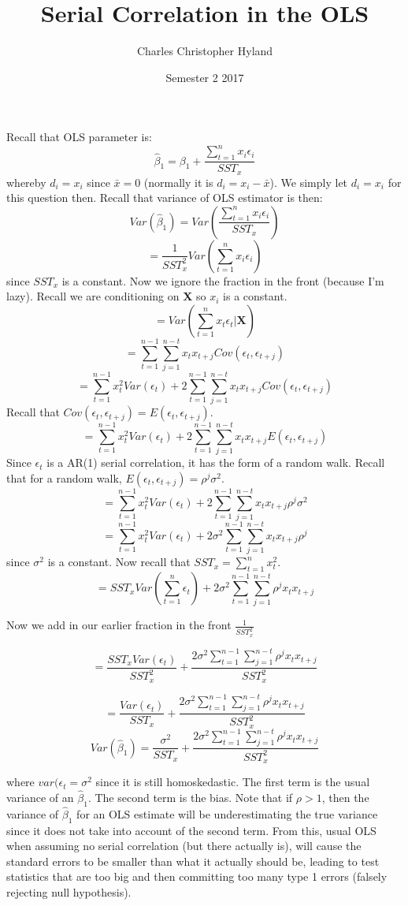 \documentclass[11pt, oneside]{article}
\title{Serial Correlation in the OLS}
\author{Charles Christopher Hyland}
\date{Semester 2 2017}
\theoremstyle{definition}
\begin{document}
\maketitle
{}

Recall that OLS parameter is:
$$
\hat{\beta}_1 = \beta_1 + \frac{\sum\limits_{t=1}^nx_i\epsilon_i}{SST_x}
$$
whereby $d_i = x_i$ since $\bar{x} = 0$ (normally it is $d_i = x_i - \bar{x}$). We simply let $d_i = x_i$ for this question then. Recall that variance of OLS estimator is then:
$$
Var(\hat{\beta}_1) = Var(\frac{\sum\limits_{t=1}^nx_i\epsilon_i}{SST_x})
$$
$$
= \frac{1}{SST_x^2}Var(\sum\limits_{t=1}^nx_i\epsilon_i)
$$
since $SST_x$ is a constant. Now we ignore the fraction in the front (because I'm lazy). Recall we are conditioning on \textbf{X} so $x_i$ is a constant.
$$
= Var(\sum\limits_{t=1}^{n}x_t\epsilon_t|\bm{X})
$$
$$
= \sum\limits_{t=1}^{n-1}\sum\limits_{j=1}^{n-t}x_tx_{t+j}Cov(\epsilon_t,\epsilon_{t+j})
$$
$$
= \sum\limits_{t=1}^{n-1}x_t^2Var(\epsilon_t) +  2\sum\limits_{t=1}^{n-1}\sum\limits_{j=1}^{n-t}x_tx_{t+j}Cov(\epsilon_t,\epsilon_{t+j})
$$
Recall that $Cov(\epsilon_t,\epsilon_{t+j}) = E(\epsilon_t,\epsilon_{t+j})$.
$$
= \sum\limits_{t=1}^{n-1}x_t^2Var(\epsilon_t) +  2\sum\limits_{t=1}^{n-1}\sum\limits_{j=1}^{n-t}x_tx_{t+j}E(\epsilon_t,\epsilon_{t+j})
$$
Since $\epsilon_t$ is a AR(1) serial correlation, it has the form of a random walk. Recall that for a random walk, $E(\epsilon_t,\epsilon_{t+j}) = \rho^j\sigma^2$.
$$
= \sum\limits_{t=1}^{n-1}x_t^2Var(\epsilon_t) +  2\sum\limits_{t=1}^{n-1}\sum\limits_{j=1}^{n-t}x_tx_{t+j}\rho^j\sigma^2
$$
$$
= \sum\limits_{t=1}^{n-1}x_t^2Var(\epsilon_t) +  2\sigma^2\sum\limits_{t=1}^{n-1}\sum\limits_{j=1}^{n-t}x_tx_{t+j}\rho^j
$$
since $\sigma^2$ is a constant. Now recall that $SST_x = \sum\limits_{t=1}^{n}x_t^2$.
$$
= SST_xVar(\sum\limits_{t=1}^{n}\epsilon_t) +  2\sigma^2\sum\limits_{t=1}^{n-1}\sum\limits_{j=1}^{n-t}\rho^jx_tx_{t+j}
$$

Now we add in our earlier fraction in the front $\frac{1}{SST_x^2}$

$$
= \frac{SST_xVar(\epsilon_t)}{SST_x^2} +  \frac{2\sigma^2\sum\limits_{t=1}^{n-1}\sum\limits_{j=1}^{n-t}\rho^jx_tx_{t+j}}{SST_x^2}
$$

$$
= \frac{Var(\epsilon_t)}{SST_x} +  \frac{2\sigma^2\sum\limits_{t=1}^{n-1}\sum\limits_{j=1}^{n-t}\rho^jx_tx_{t+j}}{SST_x^2}
$$
$$
Var(\hat{\beta}_1)= \frac{\sigma^2}{SST_x} +  \frac{2\sigma^2\sum\limits_{t=1}^{n-1}\sum\limits_{j=1}^{n-t}\rho^jx_tx_{t+j}}{SST_x^2}
$$

where $var(\epsilon_t = \sigma^2$ since it is still homoskedastic. The first term is the usual variance of an $\hat{\beta}_1$. The second term is the bias. Note that if $\rho>1$, then the variance of $\hat{\beta}_1$ for an OLS estimate will be underestimating the true variance since it does not take into account of the second term. From this, usual OLS when assuming no serial correlation (but there actually is), will cause the standard errors to be smaller than what it actually should be, leading to test statistics that are too big and then committing too many type 1 errors (falsely rejecting null hypothesis).
\end{document}

